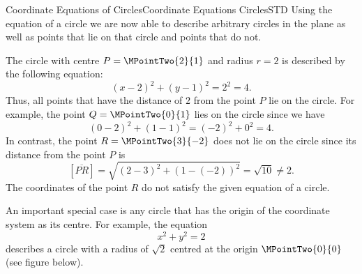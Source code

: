 \begin{MXContent}{Coordinate Equations of Circles}{Coordinate Equations Circles}{STD}
Using the equation of a circle we are now able to describe arbitrary circles in the plane as well as 
points that lie on that circle and points that do not.


\begin{MExample}
The circle with centre $P=\MPointTwo{2}{1}$ and radius $r=2$ is described by the following equation:
\[
 (x-2)^2 + (y-1)^2 = 2^2 = 4.
\]
Thus, all points that have the distance of $2$ from the point $P$ lie on the circle. For example, the point 
$Q=\MPointTwo{0}{1}$ lies on the circle since we have
\[
 (0-2)^2 + (1-1)^2 = (-2)^2 + 0^2 = 4.
\]
In contrast, the point $R=\MPointTwo{3}{-2}$ does not lie on the circle since its distance from the point $P$ is
\[
 [\overline{P R}] = \sqrt{(2-3)^2 + (1-(-2))^2} = \sqrt{10} \neq 2.
\]
The coordinates of the point $R$ do not satisfy the given equation of a circle.

\begin{center}
%
\end{center}
\end{MExample}

An important special case is any circle that has the origin of the coordinate system as its 
centre. For example, the equation
\[
 x^2+y^2=2
\]
describes a circle with a radius of $\sqrt{2}$ centred at the origin $\MPointTwo{0}{0}$ (see figure below).


\end{MXContent}
